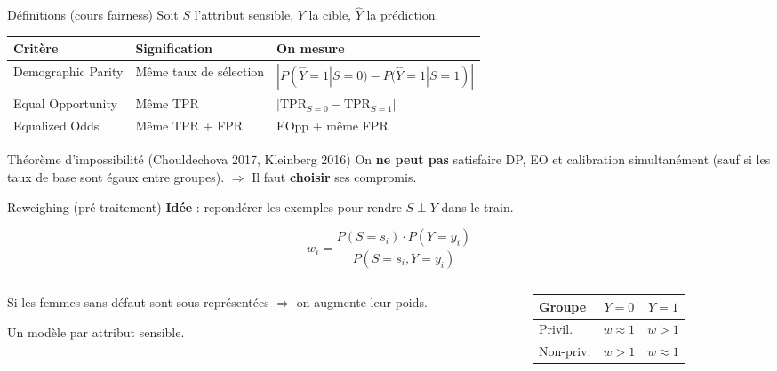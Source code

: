 \documentclass[aspectratio=169, 11pt]{beamer}
\begin{document}
\begin{frame}{D\'efinitions (cours fairness)}
Soit $S$ l'attribut sensible, $Y$ la cible, $\hat{Y}$ la pr\'ediction.

\vspace{0.5em}
\begin{tabular}{lll}
\toprule
\textbf{Crit\`ere} & \textbf{Signification} & \textbf{On mesure} \\
\midrule
Demographic Parity & M\^eme taux de s\'election & $|P(\hat{Y}{=}1|S{=}0) - P(\hat{Y}{=}1|S{=}1)|$ \\
Equal Opportunity & M\^eme TPR & $|\text{TPR}_{S=0} - \text{TPR}_{S=1}|$ \\
Equalized Odds & M\^eme TPR + FPR & EOpp + m\^eme FPR \\
\bottomrule
\end{tabular}

\vspace{0.8em}
\begin{alertblock}{Th\'eor\`eme d'impossibilit\'e (Chouldechova 2017, Kleinberg 2016)}
On \textbf{ne peut pas} satisfaire DP, EO et calibration simultan\'ement
(sauf si les taux de base sont \'egaux entre groupes).
$\Rightarrow$ Il faut \textbf{choisir} ses compromis.
\end{alertblock}
\end{frame}

\begin{frame}{Reweighing (pr\'e-traitement)}
\textbf{Id\'ee} : repondérer les exemples pour rendre $S \perp Y$ dans le train.

$$w_i = \frac{P(S{=}s_i) \cdot P(Y{=}y_i)}{P(S{=}s_i, Y{=}y_i)}$$

\begin{columns}[T]
\begin{column}{0.55\textwidth}
Si les femmes sans d\'efaut sont sous-repr\'esent\'ees
$\Rightarrow$ on augmente leur poids.

\vspace{0.5em}
Un mod\`ele par attribut sensible.
\end{column}
\begin{column}{0.42\textwidth}
\centering\small
\begin{tabular}{lcc}
\toprule
Groupe & $Y{=}0$ & $Y{=}1$ \\
\midrule
Privil. & $w \approx 1$ & $w > 1$ \\
Non-priv. & $w > 1$ & $w \approx 1$ \\
\bottomrule
\end{tabular}
\end{column}
\end{columns}
\end{frame}
\end{document}
